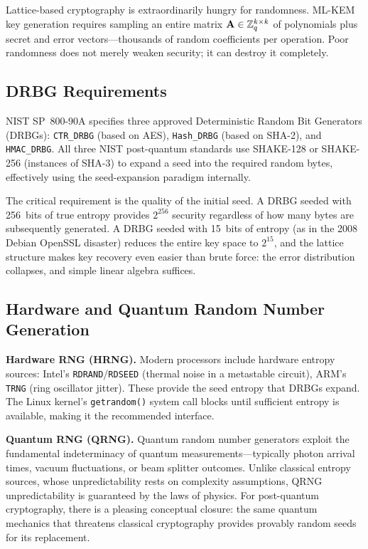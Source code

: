 Lattice-based cryptography is extraordinarily hungry for randomness.  ML-KEM key generation requires sampling an entire matrix $\mathbf{A} \in \mathbb{Z}_q^{k \times k}$ of polynomials plus secret and error vectors---thousands of random coefficients per operation.  Poor randomness does not merely weaken security; it can destroy it completely.

\subsection{DRBG Requirements}
\label{subsec:drbg}

NIST SP~800-90A specifies three approved Deterministic Random Bit Generators (DRBGs): \texttt{CTR\_DRBG} (based on AES), \texttt{Hash\_DRBG} (based on SHA-2), and \texttt{HMAC\_DRBG}.  All three NIST post-quantum standards use SHAKE-128 or SHAKE-256 (instances of SHA-3) to expand a seed into the required random bytes, effectively using the seed-expansion paradigm internally.

The critical requirement is the quality of the initial seed.  A DRBG seeded with 256~bits of true entropy provides $2^{256}$ security regardless of how many bytes are subsequently generated.  A DRBG seeded with 15~bits of entropy (as in the 2008 Debian OpenSSL disaster) reduces the entire key space to $2^{15}$, and the lattice structure makes key recovery even easier than brute force: the error distribution collapses, and simple linear algebra suffices.

\subsection{Hardware and Quantum Random Number Generation}
\label{subsec:hw-qrng}

\textbf{Hardware RNG (HRNG).}  Modern processors include hardware entropy sources: Intel's \texttt{RDRAND}/\texttt{RDSEED} (thermal noise in a metastable circuit), ARM's \texttt{TRNG} (ring oscillator jitter).  These provide the seed entropy that DRBGs expand.  The Linux kernel's \texttt{getrandom()} system call blocks until sufficient entropy is available, making it the recommended interface.

\textbf{Quantum RNG (QRNG).}  Quantum random number generators exploit the fundamental indeterminacy of quantum measurements---typically photon arrival times, vacuum fluctuations, or beam splitter outcomes.  Unlike classical entropy sources, whose unpredictability rests on complexity assumptions, QRNG unpredictability is guaranteed by the laws of physics.  For post-quantum cryptography, there is a pleasing conceptual closure: the same quantum mechanics that threatens classical cryptography provides provably random seeds for its replacement.

